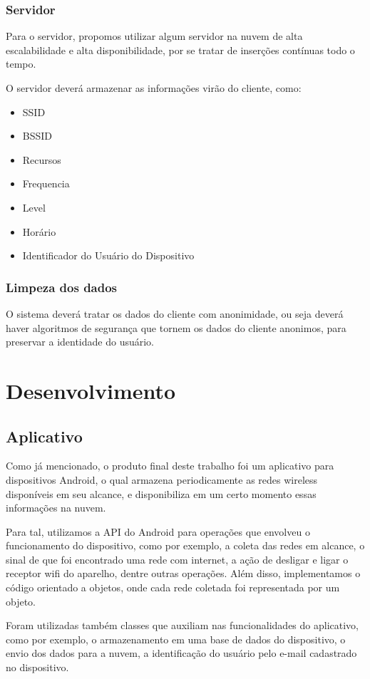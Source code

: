 \documentclass[12pt, %
openright, 
oneside,
a4paper,
brazil]{facom-ufu-abntex2}
\begin{document}
\subsection{Servidor}
Para o servidor, propomos utilizar algum servidor na nuvem de alta escalabilidade e alta disponibilidade, por se tratar de inserções contínuas todo o tempo.

O servidor deverá armazenar as informações virão do cliente, como:
\begin{itemize}
  \item SSID
  \item BSSID
  \item Recursos
  \item Frequencia
  \item Level
  \item Horário
  \item Identificador do Usuário do Dispositivo
  \end{itemize}
  
\subsection{Limpeza dos dados}
O sistema deverá tratar os dados do cliente com anonimidade, ou seja deverá haver algoritmos de segurança que tornem os dados do cliente anonimos, para preservar a identidade do usuário.
\chapter{Desenvolvimento}
\section{Aplicativo}
Como já mencionado, o produto final deste trabalho foi um aplicativo para dispositivos Android, o qual armazena periodicamente as redes wireless disponíveis em seu alcance, e disponibiliza em um certo momento essas informações na nuvem.

Para tal, utilizamos a API do Android para operações que envolveu o funcionamento do dispositivo, como por exemplo, a coleta das redes em alcance, o sinal de que foi encontrado uma rede com internet, a ação de desligar e ligar o receptor wifi do aparelho, dentre outras operações. Além disso, implementamos o código orientado a objetos, onde cada rede coletada foi representada por um objeto.

Foram utilizadas também classes que auxiliam nas funcionalidades do aplicativo, como por exemplo, o armazenamento em uma base de dados do dispositivo, o envio dos dados para a nuvem, a identificação do usuário pelo e-mail cadastrado no dispositivo.
\end{document}
